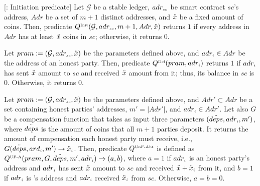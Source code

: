  \vs
 
 \begin{definition}
  [\qinit: Initiation predicate] Let $\mathcal{G}$ be a stable ledger, $adr_{\scriptscriptstyle sc}$ be smart contract $sc$'s address, $Adr$ be a set of $m+1$ distinct addresses, and $\ddot{x}$ be a fixed amount of coins. Then, predicate $Q^{\scriptscriptstyle \text{Init}}(\mathcal{G}, adr_{\scriptscriptstyle sc}, m+1, Adr, \ddot{x})$ returns $1$ if every address in $Adr$ has at least $\ddot{x}$ coins in $sc$; otherwise, it returns $0$. 
 \end{definition}

 
 \vs
 \vs
    \begin{definition}   Let $pram:=(\mathcal{G}, adr_{\scriptscriptstyle sc}, \ddot{x})$ be the parameters defined above, and   $adr_{\scriptscriptstyle i}\in Adr$ be the address of an honest party. 
    Then, predicate $Q^{\scriptscriptstyle \text{Del}}(pram, adr_{\scriptscriptstyle i})$ returns $1$ if $adr_{\scriptscriptstyle i}$ has sent $\ddot{x}$ amount to $sc$ and received  $\ddot{x}$ amount from it; thus,  its balance in $sc$ is $0$. Otherwise, it returns $0$. 
  \end{definition}
 
 
 \vs
 \vs
 
   \begin{definition}  
 Let $pram:=(\mathcal{G}, adr_{\scriptscriptstyle sc}, \ddot{x})$ be the parameters defined above, and $Adr'\subset Adr$ be a set containing honest parties' addresses, $m' = |Adr'|$,  and   $adr_{\scriptscriptstyle i}\in Adr'$. Let also $G$ be a compensation function that takes as input  three parameters $(\ddot{deps}, adr_{\scriptscriptstyle i}, m')$, where $\ddot{deps}$ is the amount of coins  that all $m+1$ parties  deposit. It returns the amount of compensation each honest party must receive, i.e., $G(\ddot{deps}, ard_{\scriptscriptstyle i}, m')\rightarrow \ddot{x}_{\scriptscriptstyle i}$. Then, predicate $Q^{\scriptscriptstyle \text{UnF-Abt}}$ is defined as $Q^{\scriptscriptstyle \text{UF-A}}(pram, G, \ddot{deps}, m', adr_{\scriptscriptstyle i})\rightarrow (a,b)$, where $a=1$ if $adr_{\scriptscriptstyle i}$ is an honest party's address and $adr_{\scriptscriptstyle i}$ has sent $\ddot{x}$ amount to $sc$ and received  $\ddot{x}+\ddot{x}_{\scriptscriptstyle i}$  from it, and $b=1$ if $adr_{\scriptscriptstyle i}$ is \aud's address and $adr_{\scriptscriptstyle i}$ received $\ddot{x}_{\scriptscriptstyle i}$  from $sc$. Otherwise, $a=b=0$. 
  \end{definition}
  
  \vs
  \vs
  
